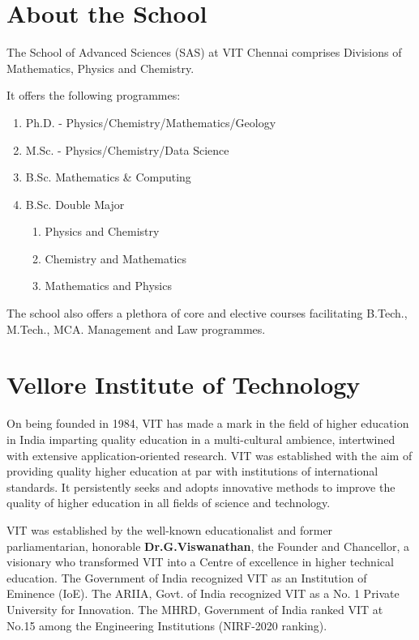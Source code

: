 \section{About the School}

The School of Advanced Sciences (SAS) at VIT Chennai comprises Divisions of Mathematics, Physics and Chemistry.

It offers the following programmes:
\begin{enumerate}[label={\color{primaryColor}\faCheckSquareO}]
	\item Ph.D. - Physics/Chemistry/Mathematics/Geology
	\item M.Sc. - Physics/Chemistry/Data Science
	\item B.Sc. Mathematics \& Computing
	\item B.Sc. Double Major
	\begin{enumerate}[label={\color{primaryColor}\faChevronRight}]
		\item Physics and Chemistry
		\item Chemistry and Mathematics 
		\item Mathematics and Physics  
	\end{enumerate}
\end{enumerate}


The school also offers a plethora of core and elective courses facilitating B.Tech., M.Tech., MCA. Management and Law programmes.

\section{Vellore Institute of Technology}
On being founded in 1984, VIT has made a mark in the field of higher education in India imparting quality education in a multi-cultural ambience, intertwined with extensive application-oriented research.
VIT was established with the aim of providing quality higher education at par with institutions of international standards. It persistently seeks and adopts innovative methods to improve the quality of higher education in all fields of science and technology. 





VIT was established by the well-known educationalist and former parliamentarian, honorable \textbf{Dr.\;G.\;Viswanathan}, the Founder and Chancellor, a visionary who transformed VIT into a Centre of excellence in higher technical education. The Government of India recognized VIT as an Institution of Eminence (IoE). The ARIIA, Govt. of India recognized VIT as a No. 1 Private University for Innovation. The MHRD, Government of India ranked VIT at No.15 among the Engineering Institutions (NIRF-2020 ranking).
